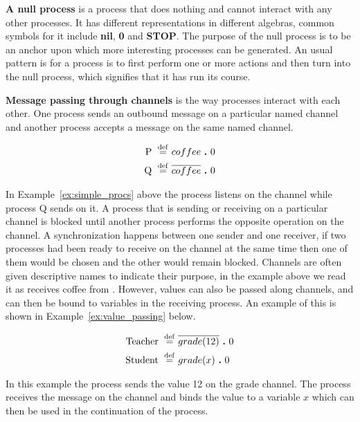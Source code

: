 	\textbf{A null process} is a process that does nothing and cannot interact 
	with any other processes. It has different representations in different 
	algebras, common symbols for it include \textbf{nil}, \textbf{0} and 
	\textbf{STOP}. The purpose of the null process is to be an anchor upon which 
	more interesting processes can be generated. An usual pattern is for a 
	process is to first perform one or more actions and then turn into the null 
	process, which signifies that it has run its course.
	
	\textbf{Message passing through channels} is the way processes interact with 
	each other. One process sends an outbound message on a particular named 
	channel and another process accepts a message on the same named channel. 

	\begin{Exa}
	\label{ex:simple_procs}
	\begin{align*}
			\mathrm{P} \ \stackrel{\mathrm{def}}{=}\  & coffee \ \textbf{.}\  0 \\
			\mathrm{Q} \ \stackrel{\mathrm{def}}{=}\  & \overline{coffee} \ \textbf{.}\  0 
	\end{align*}	
	\end{Exa}
				
	In Example~\ref{ex:simple_procs} above the process  listens on the 
	 channel while process Q sends on it. A process that is 
	sending or receiving on a particular channel is blocked until another process
	performs the opposite operation on the channel. A synchronization happens 
	between one sender and one receiver, if two processes had been ready to 
	receive on the  channel at the same time then one of them 
	would be chosen and the other would remain blocked. Channels are often given 
	descriptive names to indicate their purpose, in the example above we read it 
	as  receives coffee from . However, values can also be 
	passed along channels, and can then be bound to variables in the receiving 
	process. An example of this is shown in Example~\ref{ex:value_passing} below.
	
	\begin{Exa}\label{ex:value_passing}
	\begin{align*}
			\mathrm{Teacher} \ \stackrel{\mathrm{def}}{=}\  & \overline{grade(12)} \ \textbf{.}\  0 \\
			\mathrm{Student} \ \stackrel{\mathrm{def}}{=}\  & grade(x) \ \textbf{.}\  0 
	\end{align*}	
	\end{Exa}

	In this example the  process sends the value 12 on the 
	\textsf{grade} channel. The  process receives the message on 
	the channel and binds the value to a variable $x$ which can then be used in 
	the continuation of the process.
	
